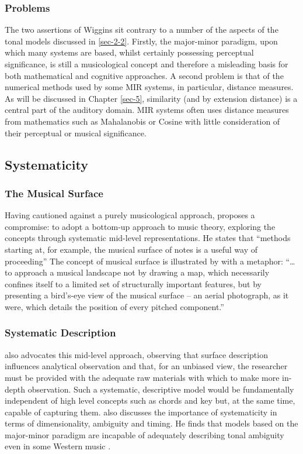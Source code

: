 \documentclass{article}
\begin{document}
\subsubsection{Problems}
\label{sec-2-3-3}

The two assertions of Wiggins sit contrary to a number of the aspects
of the tonal models discussed in \ref{sec-2-2}. Firstly, the
major-minor paradigm, upon which many systems are based, whilst
certainly possessing perceptual significance, is still a musicological
concept and therefore a misleading basis for both mathematical and
cognitive approaches. A second problem is that of the numerical
methods used by some MIR systems, in particular, distance measures. As
will be discussed in Chapter \ref{sec-5}, similarity
(and by extension distance) is a central part of the auditory
domain. MIR systems often uses distance measures from mathematics such
as Mahalanobis \citep{Tzanetakis1999} or Cosine \citep{Foote2000} with
little consideration of their perceptual or musical significance.
\subsection{Systematicity}
\label{sec-2-4}
\subsubsection{The Musical Surface}
\label{sec-2-4-1}

Having cautioned against a purely musicological approach,
\citet[pp. 481]{Wiggins2009} proposes a compromise: to adopt a
bottom-up approach to music theory, exploring the concepts through
systematic mid-level representations. He states that ``methods
starting at, for example, the musical surface of notes is a useful way
of proceeding'' The concept of musical surface is illustrated by
\citet[pp. 159]{Huovinen2007} with a metaphor: ``\ldots{}to approach a
musical landscape not by drawing a map, which necessarily confines
itself to a limited set of structurally important features, but by
presenting a bird’s-eye view of the musical surface – an aerial
photograph, as it were, which details the position of every pitched
component.''
\subsubsection{Systematic Description}
\label{sec-2-4-2}

\citet{Martorell2013} also advocates this mid-level approach,
observing that surface description influences analytical observation
and that, for an unbiased view, the researcher must be provided with
the adequate raw materials with which to make more in-depth
observation. Such a systematic, descriptive model would be
fundamentally independent of high level concepts such as chords and
key but, at the same time, capable of capturing
them. \citet{Martorell2013} also discusses the importance of
systematicity in terms of dimensionality, ambiguity and timing. He
finds that models based on the major-minor paradigm are incapable of
adequately describing tonal ambiguity even in some Western music
\citep[chap. 3]{Martorell2013}.
\end{document}
